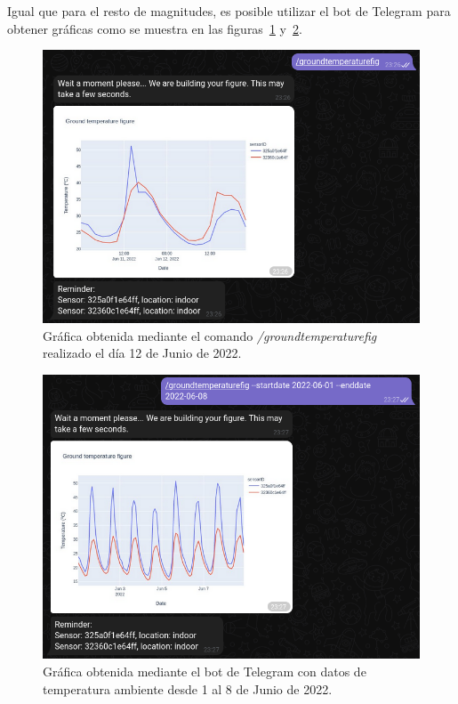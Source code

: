 \documentclass[a4paper, 12pt, oneside]{book}
\begin{document}
Igual que para el resto de magnitudes, es posible utilizar el bot de Telegram para obtener gráficas como se muestra en las figuras~\ref{figura:groundtemperaturefig_telegram} y~\ref{figura:groundtemperaturefig_telegram_options}.

\begin{figure}[H]
	\centering
    \includegraphics[width=12cm, keepaspectratio]{img/groundtemperaturefig_telegram}
    \caption{Gráfica obtenida mediante el comando \textit{/groundtemperaturefig} realizado el día 12 de Junio de 2022.}
    \label{figura:groundtemperaturefig_telegram}
\end{figure}

\begin{figure}[H]
	\centering
    \includegraphics[width=12cm, keepaspectratio]{img/groundtemperaturefig_telegram_options}
    \caption{Gráfica obtenida mediante el bot de Telegram con datos de temperatura ambiente desde 1 al 8 de Junio de 2022.}
    \label{figura:groundtemperaturefig_telegram_options}
\end{figure}
\end{document}
